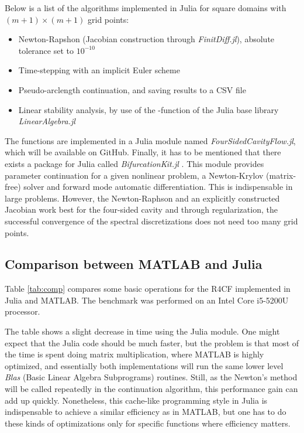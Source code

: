 Below is a list of the algorithms implemented in Julia for square domains with
$(m+1) \times (m+1)$ grid points:

\begin{itemize}
  \item Newton-Rapshon (Jacobian construction through \emph{FinitDiff.jl}),
    absolute tolerance set to $10^{-10}$
  \item Time-stepping with an implicit Euler scheme
  \item Pseudo-arclength continuation, and saving results to a CSV file
  \item Linear stability analysis, by use of the -function of the
    Julia base library \emph{LinearAlgebra.jl}
\end{itemize}

The functions are implemented in a Julia module named
\emph{FourSidedCavityFlow.jl}, which will be available on GitHub. Finally, it
has to be mentioned that there exists a package for Julia called
\emph{BifurcationKit.jl} \citep{veltz2020}. This module provides parameter
continuation for a given nonlinear problem, a Newton-Krylov (matrix-free)
solver and forward mode automatic differentiation. This is indispensable in
large problems. However, the Newton-Raphson and an explicitly constructed
Jacobian work best for the four-sided cavity and through regularization, the
successful convergence of the spectral discretizations does not need too many
grid points.

\subsection{Comparison between MATLAB and Julia}

Table \ref{tab:comp} compares some basic operations for the R4CF implemented in
Julia and MATLAB. The benchmark was performed on an Intel Core i5-5200U
processor.

The table shows a slight decrease in time using the Julia module. One might
expect that the Julia code should be much faster, but the problem is that most
of the time is spent doing matrix multiplication, where MATLAB is highly
optimized, and essentially both implementations will run the same lower level
\emph{Blas} (Basic Linear Algebra Subprograms) routines. Still, as the Newton's
method will be called repeatedly in the continuation algorithm, this
performance gain can add up quickly. Nonetheless, this cache-like programming
style in Julia is indispensable to achieve a similar efficiency as in MATLAB,
but one has to do these kinds of optimizations only for specific functions
where efficiency matters.

